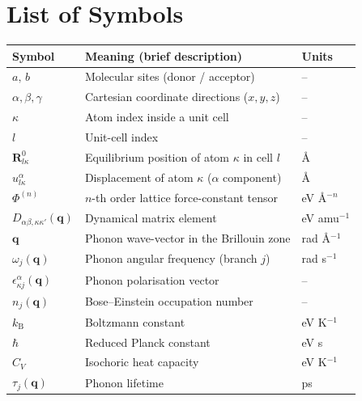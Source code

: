 \thispagestyle{plain}
\section*{\Huge List of Symbols}%
{}

\begin{center}
\begin{tabular}{p{2.2cm} p{8.5cm} p{}}
Symbol & Meaning (brief description) & Units \\
\midrule\midrule
$a,\,b$               & Molecular sites (donor / acceptor) & -- \\
$\alpha,\beta,\gamma$ & Cartesian coordinate directions ($x,y,z$) & -- \\
$\kappa$              & Atom index inside a unit cell              & -- \\
$l$                   & Unit-cell index                            & -- \\
$\mathbf{R}^{0}_{l\kappa}$ & Equilibrium position of atom $\kappa$ in cell $l$ & Å \\
$u^{\alpha}_{l\kappa}$ & Displacement of atom $\kappa$ ($\alpha$ component) & Å \\
$\Phi^{(n)}$          & $n$-th order lattice force-constant tensor & eV Å$^{-n}$ \\
$D_{\alpha\beta,\kappa\kappa'}(\mathbf{q})$ & Dynamical matrix element & eV amu$^{-1}$ \\
$\mathbf{q}$          & Phonon wave-vector in the Brillouin zone   & rad Å$^{-1}$ \\
$\omega_{j}(\mathbf{q})$ & Phonon angular frequency (branch $j$) & rad s$^{-1}$ \\
$\epsilon^{\alpha}_{\kappa j}(\mathbf{q})$ & Phonon polarisation vector & -- \\
$n_{j}(\mathbf{q})$   & Bose–Einstein occupation number           & -- \\
$k_{\mathrm B}$       & Boltzmann constant                        & eV K$^{-1}$ \\
$\hbar$               & Reduced Planck constant                   & eV s \\
$C_V$                 & Isochoric heat capacity                   & eV K$^{-1}$ \\
$\tau_{j}(\mathbf{q})$ & Phonon lifetime                           & ps \\

\end{tabular}
\end{center}
